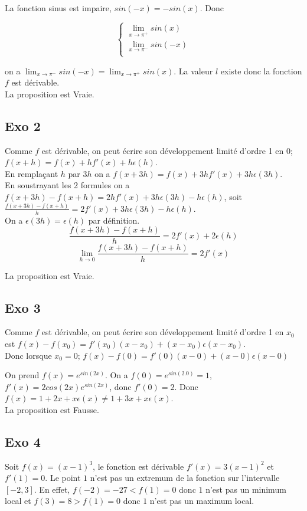 \documentclass[]{book}
\theoremstyle{definition}
\begin{document}
La fonction sinus est impaire, $sin(-x) = -sin(x)$. Donc

$$ 
\left\{ 
\begin{array}{l}
 \lim_{x \to \pi^{+}} sin(x) \\
 \lim_{x \to \pi^{-}} sin(-x) \\
\end{array}
\right. 
$$

on a $\lim_{x \to \pi^{-}} sin(-x) = \lim_{x \to \pi^{+}} sin(x)$. La valeur $l$ existe donc la fonction $f$ est d\'erivable.\\


La proposition est Vraie.

\subsection*{Exo 2}
Comme $f$ est d\'erivable, on peut \'ecrire son d\'eveloppement limit\'e d'ordre 1 en $0$; $f(x+h) = f(x) + hf'(x) + h\epsilon(h)$.\\

En rempla\c{c}ant $h$ par $3h$ on a $f(x+3h) = f(x) + 3hf'(x) + 3h\epsilon(3h) $.\\
En soustrayant les 2 formules on a $f(x+3h)-f(x+h) = 2hf'(x) + 3h\epsilon(3h)- h\epsilon(h)$, soit $\frac{f(x+3h)-f(x+h)}{h} = 2f'(x) + 3h\epsilon(3h) - h\epsilon(h)$.\\
On a $\epsilon(3h) = \epsilon(h)$ par d\'efinition.
$$\frac{f(x+3h)-f(x+h)}{h} = 2f'(x) + 2\epsilon(h)$$
$$\lim_{h \to 0} \frac{f(x+3h)-f(x+h)}{h} = 2f'(x)$$

La proposition est Vraie.

\subsection*{Exo 3}
Comme $f$ est d\'erivable, on peut \'ecrire son d\'eveloppement limit\'e d'ordre 1 en $x_0$ est $f(x) - f(x_0) = f'(x_0)(x - x_0) + (x - x_0)\epsilon(x - x_0)$.\\
Donc lorsque $x_0 = 0$; $f(x) - f(0) = f'(0)(x - 0) + (x - 0)\epsilon(x - 0)$

On prend $f(x) = e^{sin(2x)}$. On a $f(0) = e^{sin(2.0)} = 1$, $f'(x) = 2cos(2x)e^{sin(2x)}$, donc $f'(0) = 2$. Donc $f(x) = 1 + 2x + x\epsilon(x) \neq 1 + 3x + x\epsilon(x) $.\\

La proposition est Fausse.


\subsection*{Exo 4}
Soit $f(x) = (x-1)^3$, le fonction est d\'erivable $f'(x)=3(x-1)^2$ et $f'(1) = 0$. Le point $1$ n'est pas un extremum de la fonction sur l'intervalle $[-2,3]$. En effet, $f(-2) = -27 < f(1) = 0$ donc $1$ n'est pas un minimum local et $f(3) = 8 > f(1) = 0$ donc $1$ n'est pas un maximum local.\\
\end{document}

